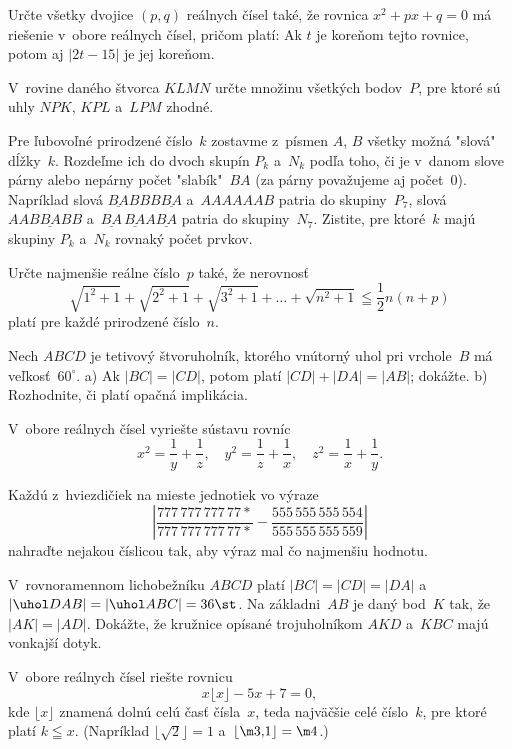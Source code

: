 ﻿{%
Určte všetky dvojice $(p,q)$ reálnych čísel také, že
rovnica $x^2+px+q=0$ má riešenie v~obore reálnych čísel,
pričom platí:
Ak $t$ je koreňom tejto rovnice, potom aj $|2t-15|$ je jej koreňom.}

{%
V~rovine daného štvorca $KLMN$ určte množinu všetkých bodov~$P$,
pre ktoré sú uhly $NPK$, $KPL$ a~$LPM$ zhodné.}

{%
Pre ľubovoľné prirodzené číslo~$k$ zostavme z~písmen $A$, $B$
všetky možná "slová" dĺžky~$k$. Rozdeľme ich do dvoch skupín $P_k$
a~$N_k$ podľa toho, či je v~danom slove párny alebo nepárny počet
"slabík"~$BA$ (za párny považujeme aj počet~$0$). Napríklad slová
$\underline{BA}BBB\underline{BA}$ a~$AAAAAAB$ patria do
skupiny~$P_7$, slová $AAB\underline{BA}BB$
a~$\underline{BA}\,\underline{BA}A\underline{BA}$ patria do
skupiny~$N_7$. Zistite, pre ktoré~$k$ majú skupiny $P_k$ a~$N_k$
rovnaký počet prvkov.}

{%
Určte najmenšie reálne číslo~$p$ také, že nerovnosť
$$
\sqrt{1^2+1}+\sqrt{2^2+1}+\sqrt{3^2+1}+\dots+
\sqrt{n^2+1}\leqq\frac12 n(n+p)
$$
platí pre každé prirodzené číslo~$n$.}

{%
Nech $ABCD$ je tetivový štvoruholník, ktorého vnútorný uhol pri
vrchole~$B$ má veľkosť~$60^{\circ}$.
\ite a) Ak $|BC|=|CD|$, potom platí $|CD|+|DA|=|AB|$; dokážte.
\ite b) Rozhodnite, či platí opačná implikácia.}

{%
V~obore reálnych čísel vyriešte sústavu rovníc
$$
x^2=\frac{1}{y}+\frac{1}{z},\quad
y^2=\frac{1}{z}+\frac{1}{x},\quad
z^2=\frac{1}{x}+\frac{1}{y}.
$$}

{%
Každú z~hviezdičiek na mieste jednotiek vo výraze
$$
\left|\frac{777\,777\,777\,77*}{777\,777\,777\,77*}-
\frac{555\,555\,555\,554}{555\,555\,555\,559}\right|
$$
nahraďte nejakou číslicou tak, aby výraz mal čo najmenšiu hodnotu.}

{%
V~rovnoramennom lichobežníku $ABCD$ platí $|BC|=|CD|=|DA|$
a~$|\uhol DAB|=|\uhol ABC|=36\st$. Na základni~$AB$ je daný bod~$K$
tak, že $|AK|=|AD|$. Dokážte, že kružnice opísané trojuholníkom $AKD$
a~$KBC$ majú vonkajší dotyk.}

{%
V~obore reálnych čísel riešte rovnicu
$$
x\lfloor x\rfloor-5x+7=0,
$$
kde $\lfloor x\rfloor$ znamená dolnú celú časť čísla~$x$, teda
najväčšie celé číslo~$k$, pre ktoré platí $k\leqq x$. (Napríklad
$\lfloor\sqrt{2}\rfloor=1$ a~$\lfloor\m3{,}1\rfloor=\m4$.)}

